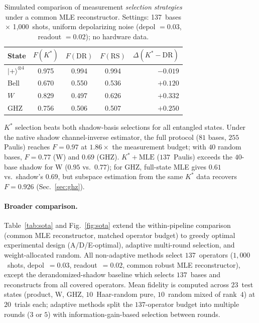 \documentclass[twocolumn,prx,aps,superscriptaddress,longbibliography,floatfix]{revtex4-2}
\begin{document}
\begin{table}[tb]
\centering
\caption{Simulated comparison of measurement \emph{selection strategies}
under a common MLE reconstructor.
Settings: 137~bases $\times$ 1{,}000~shots, uniform depolarizing noise
(depol $= 0.03$, readout $= 0.02$); no hardware data.}
\label{tab:shadows}
\begin{tabular}{lcccr}
\toprule
State & $F(K^*)$ & $F(\mathrm{DR})$ & $F(\mathrm{RS})$
      & $\Delta(K^*{-}\mathrm{DR})$ \\
\midrule
$|{+}\rangle^{\otimes 4}$ & 0.975 & 0.994 & 0.994 & $-0.019$ \\
Bell                       & 0.670 & 0.550 & 0.536 & $+0.120$ \\
$W$                        & 0.829 & 0.497 & 0.626 & $+0.332$ \\
GHZ                        & 0.756 & 0.506 & 0.507 & $+0.250$ \\
\bottomrule
\end{tabular}
\end{table}

$K^*$ selection beats both shadow-basis selections for all
entangled states.
Under the native shadow channel-inverse estimator, the full protocol
($81$ bases, $255$ Paulis) reaches $F = 0.97$ at $1.86\times$ the
measurement budget; with $40$ random bases, $F = 0.77$ (W) and
$0.69$ (GHZ).  $K^*{+}\text{MLE}$ ($137$~Paulis) exceeds the
$40$-base shadow for W ($0.95$ vs.\ $0.77$); for GHZ,
full-state MLE gives $0.61$ vs.\ shadow's $0.69$, but subspace
estimation from the same $K^*$ data recovers $F = 0.926$
(Sec.~\ref{sec:ghz}).

\paragraph{Broader comparison.}
Table~\ref{tab:sota} and Fig.~\ref{fig:sota} extend the
within-pipeline comparison (common MLE reconstructor, matched
operator budget) to greedy optimal
experimental design (A/D/E-optimal), adaptive multi-round
selection, and weight-allocated random.
All non-adaptive methods select $137$~operators
($1{,}000$~shots, depol~$= 0.03$, readout~$= 0.02$,
common robust MLE reconstructor), except the
derandomized-shadow baseline which selects $137$~bases
and reconstructs from all covered operators.
Mean fidelity is computed across $23$~test states (product,
W, GHZ, $10$~Haar-random pure, $10$~random mixed of rank~$4$)
at $20$~trials each; adaptive methods split the $137$-operator
budget into multiple rounds ($3$ or $5$) with
information-gain-based selection between rounds.
\end{document}
